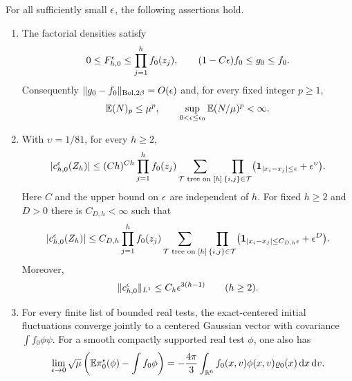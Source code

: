 \begin{proposition}\label{prop:initial}
For all sufficiently small $\epsilon$, the following assertions hold.
\begin{enumerate}[label=\textup{(\roman*)}]
\item The factorial densities satisfy
\begin{equation}\label{eq:initial-factorial-upper}
 0\le F_{h,0}^{\epsilon}\le\prod_{j=1}^h f_0(z_j),
 \qquad (1-C\epsilon)f_0\le g_0\le f_0.
\end{equation}
Consequently $\|g_0-f_0\|_{\mathrm{Bol},2\beta}=O(\epsilon)$ and, for every
fixed integer $p\ge1$,
\begin{equation}\label{eq:initial-N-moments}
 \mathbb E(N)_p\le\mu^p,
 \qquad \sup_{0<\epsilon\le\epsilon_0}\mathbb E(N/\mu)^p<\infty.
\end{equation}
\item With $\upsilon=1/81$, for every $h\ge2$,
\begin{equation}\label{eq:initial-coarse-links}
 |c_{h,0}^{\epsilon}(Z_h)|
 \le (Ch)^{Ch}\prod_{j=1}^h f_0(z_j)
   \sum_{\mathcal T\text{ tree on }[h]}
     \prod_{\{i,j\}\in\mathcal T}
       \bigl(\mathbf 1_{|x_i-x_j|\le\epsilon}+\epsilon^\upsilon\bigr).
\end{equation}
Here $C$ and the upper bound on $\epsilon$ are independent of $h$.
For fixed $h\ge2$ and $D>0$ there is $C_{D,h}<\infty$ such that
\begin{equation}\label{eq:initial-sharp-links}
 |c_{h,0}^{\epsilon}(Z_h)|
 \le C_{D,h}\prod_{j=1}^h f_0(z_j)
   \sum_{\mathcal T\text{ tree on }[h]}
     \prod_{\{i,j\}\in\mathcal T}
       \bigl(\mathbf 1_{|x_i-x_j|\le C_{D,h}\epsilon}+\epsilon^D\bigr).
\end{equation}
Moreover,
\begin{equation}\label{eq:initial-integrated-cumulants}
 \|c_{h,0}^{\epsilon}\|_{L^1}\le C_h\epsilon^{3(h-1)}
 \qquad(h\ge2).
\end{equation}
\item For every finite list of bounded real tests, the exact-centered
initial fluctuations converge jointly to a centered Gaussian vector
with covariance $\int f_0\phi\psi$.
For a smooth compactly supported real test $\phi$, one also has
\begin{equation}\label{eq:initial-centering-shift}
 \lim_{\epsilon\to0}\sqrt\mu
 \left(\mathbb E\pi_0^\epsilon(\phi)-\int f_0\phi\right)
 =-\frac{4\pi}{3}\int_{\mathbb R^6}
       f_0(x,v)\phi(x,v)\varrho_0(x)\,\mathrm d x\,\mathrm d v.
\end{equation}
\end{enumerate}
\end{proposition}

